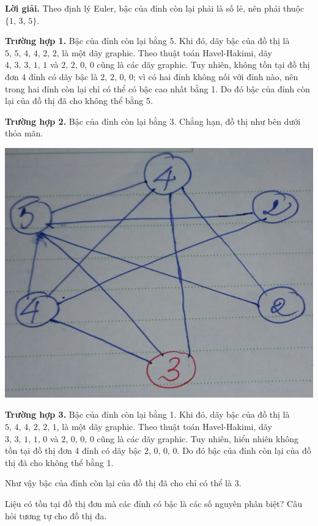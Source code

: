 \textbf{Lời giải. }Theo định lý Euler, bậc của đỉnh còn lại phải là số lẻ, nên phải thuộc $\{1,\,3,\,5\}$. 

\textbf{Trường hợp 1. }Bậc của đỉnh còn lại bằng 5. Khi đó, dãy bậc của đồ thị là $5,\,5,\,4,\,4,\,2,\,2$, là một dãy graphic. Theo thuật toán Havel-Hakimi, dãy $4,\,3,\,3,\,1,\,1$ và $2,\,2,\,0,\,0$ cũng là các dãy graphic. Tuy nhiên, không tồn tại đồ thị đơn 4 đỉnh có dãy bậc là $2,\,2,\,0,\,0$; vì có hai đỉnh không nối với đỉnh nào, nên trong hai đỉnh còn lại chỉ có thể có bậc cao nhất bằng 1. Do đó bậc của đỉnh còn lại của đồ thị đã cho không thể bằng 5.

\textbf{Trường hợp 2. }Bậc của đỉnh còn lại bằng 3. Chẳng hạn, đồ thị như bên dưới thỏa mãn.

\begin{center}
    \includegraphics[scale=0.35]{Figures/A_03_01_02.png}
\end{center}

\textbf{Trường hợp 3. }Bậc của đỉnh còn lại bằng 1. Khi đó, dãy bậc của đồ thị là $5,\,4,\,4,\,2,\,2,\,1$, là một dãy graphic. Theo thuật toán Havel-Hakimi, dãy $3,\,3,\,1,\,1,\,0$ và $2,\,0,\,0,\,0$ cũng là các dãy graphic. Tuy nhiên, hiển nhiên không tồn tại đồ thị đơn 4 đỉnh có dãy bậc $2,\,0,\,0,\,0$. Do đó bậc của đỉnh còn lại của đồ thị đã cho không thể bằng 1.

Như vậy bậc của đỉnh còn lại của đồ thị đã cho chỉ có thể là 3. 

\begin{tcolorbox}[breakable]
    \begin{baitoan}\label{pb:w02:06}
        Liệu có tồn tại đồ thị đơn mà các đỉnh có bậc là các số nguyên phân biệt? Câu hỏi tương tự cho đồ thị đa.
    \end{baitoan}
\end{tcolorbox}

